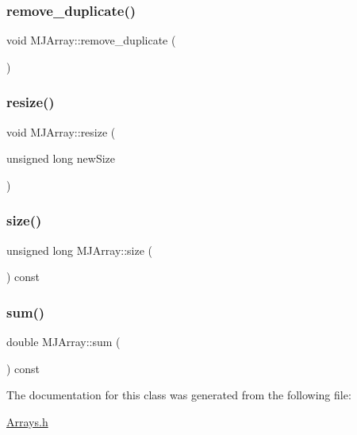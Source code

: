 \subsubsection{\texorpdfstring{remove\+\_\+duplicate()}{remove\_duplicate()}}
{\footnotesize\ttfamily void M\+J\+Array\+::remove\+\_\+duplicate (\begin{DoxyParamCaption}{ }\end{DoxyParamCaption})}

\hypertarget{classMJArray_a06c85b4ded36ba52bd8ca14d712b4b2c}{}\label{classMJArray_a06c85b4ded36ba52bd8ca14d712b4b2c} 
\subsubsection{\texorpdfstring{resize()}{resize()}}
{\footnotesize\ttfamily void M\+J\+Array\+::resize (\begin{DoxyParamCaption}\item[{unsigned long}]{new\+Size }\end{DoxyParamCaption})}

\hypertarget{classMJArray_a997898f10d39bc94bd242c308a85bb72}{}\label{classMJArray_a997898f10d39bc94bd242c308a85bb72} 
\subsubsection{\texorpdfstring{size()}{size()}}
{\footnotesize\ttfamily unsigned long M\+J\+Array\+::size (\begin{DoxyParamCaption}{ }\end{DoxyParamCaption}) const\hspace{0.3cm}{\ttfamily [inline]}}

\hypertarget{classMJArray_ad79c3f21f9d1329546de066b1b3cc9f6}{}\label{classMJArray_ad79c3f21f9d1329546de066b1b3cc9f6} 
\subsubsection{\texorpdfstring{sum()}{sum()}}
{\footnotesize\ttfamily double M\+J\+Array\+::sum (\begin{DoxyParamCaption}{ }\end{DoxyParamCaption}) const}



The documentation for this class was generated from the following file\+:\begin{DoxyCompactItemize}
\item 
\hyperlink{Arrays_8h}{Arrays.\+h}\end{DoxyCompactItemize}
